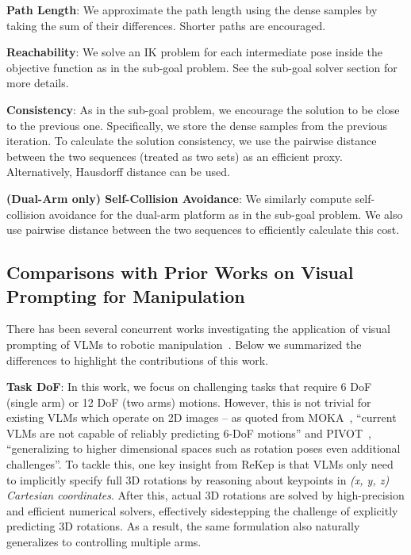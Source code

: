 \textbf{Path Length}:
We approximate the path length using the dense samples by taking the sum of their differences. Shorter paths are encouraged.

\textbf{Reachability}:
We solve an IK problem for each intermediate pose inside the objective function as in the sub-goal problem. See the sub-goal solver section for more details.

\textbf{Consistency}:
As in the sub-goal problem, we encourage the solution to be close to the previous one. Specifically, we store the dense samples from the previous iteration. To calculate the solution consistency, we use the pairwise distance between the two sequences (treated as two sets) as an efficient proxy. Alternatively, Hausdorff distance can be used.

\textbf{(Dual-Arm only) Self-Collision Avoidance}:
We similarly compute self-collision avoidance for the dual-arm platform as in the sub-goal problem. We also use pairwise distance between the two sequences to efficiently calculate this cost.

\subsection{Comparisons with Prior Works on Visual Prompting for Manipulation}\label{sec:concurrent}

There has been several concurrent works investigating the application of visual prompting of VLMs to robotic manipulation~\cite{nasiriany2024pivot,huang2024copa,liu2024moka,yuan2024robopoint,lee2024affordance}. Below we summarized the differences to highlight the contributions of this work.

\textbf{Task DoF}: In this work, we focus on challenging tasks that require 6 DoF (single arm) or 12 DoF (two arms) motions. However, this is not trivial for existing VLMs which operate on 2D images – as quoted from MOKA~\cite{liu2024moka}, ``current VLMs are not capable of reliably predicting 6-DoF motions'' and PIVOT~\cite{nasiriany2024pivot}, ``generalizing to higher dimensional spaces such as rotation poses even additional challenges''. To tackle this, one key insight from ReKep is that VLMs only need to implicitly specify full 3D rotations by reasoning about keypoints in \emph{(x, y, z) Cartesian coordinates}. After this, actual 3D rotations are solved by high-precision and efficient numerical solvers, effectively sidestepping the challenge of explicitly predicting 3D rotations. As a result, the same formulation also naturally generalizes to controlling multiple arms.

